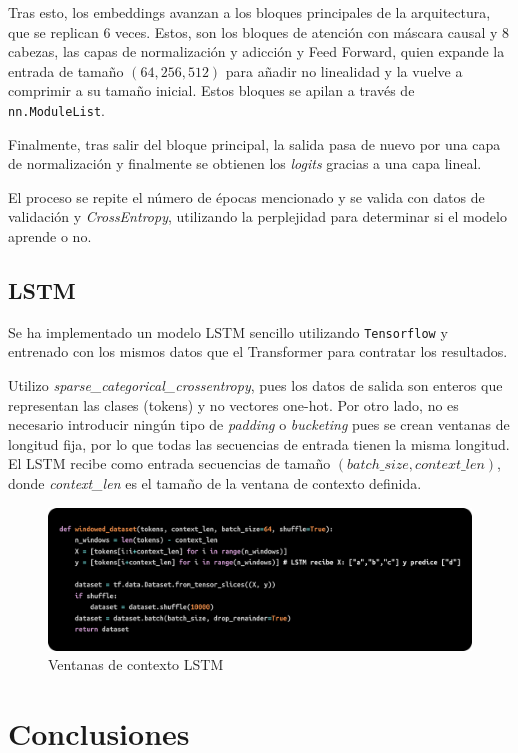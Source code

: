 \documentclass[11pt]{book}
\newcommand{\clearemptydoublepage}{\newpage{\pagestyle{empty}\cleardoublepage}}
\begin{document}
Tras esto, los embeddings avanzan a los bloques principales de la arquitectura, que se replican $6$ veces. Estos, son los bloques de atención con máscara causal y 8 cabezas, las capas de normalización y adicción y Feed Forward, quien expande la entrada de tamaño $(64,256, 512)$ para añadir no linealidad y la vuelve a comprimir a su tamaño inicial. Estos bloques se apilan a través de \texttt{nn.ModuleList}. 

Finalmente, tras salir del bloque principal, la salida pasa de nuevo por una capa de normalización y finalmente se obtienen los \textit{logits} gracias a una capa lineal. 

El proceso se repite el número de épocas mencionado y se valida con datos de validación y \textit{CrossEntropy}, utilizando la perplejidad para determinar si el modelo aprende o no.


\section{LSTM}

Se ha implementado un modelo LSTM sencillo utilizando \texttt{Tensorflow} y entrenado con los mismos datos que el Transformer para contratar los resultados. 

Utilizo \textit{sparse_categorical_crossentropy}, pues los datos de salida son enteros que representan las clases (tokens) y no vectores one-hot. Por otro lado, no es necesario introducir ningún tipo de \textit{padding} o \textit{bucketing} pues se crean ventanas de longitud fija, por lo que todas las secuencias de entrada tienen la misma longitud. El LSTM recibe como entrada secuencias de tamaño $(batch\_size, context\_len)$, donde \textit{context\_len} es el tamaño de la ventana de contexto definida.

\begin{figure}[h]
    \centering
    \includegraphics[width=0.5\linewidth]{img/window_lstm.png}
    \caption{Ventanas de contexto LSTM}
    \label{fig:placeholder24}
\end{figure}


\clearemptydoublepage

\chapter{Conclusiones}
\end{document}
